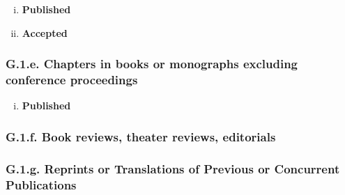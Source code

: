 \documentclass[12pt]{article}
\begin{document}
{{\begin{enumerate}[i)]
\item  {\bf Published} %

\item  {\bf Accepted} %
\end{enumerate}

\subsubsection*{G.1.e. Chapters in books or monographs excluding conference proceedings}

\begin{enumerate}[i)]
\item {\bf Published} %
\end{enumerate}


\subsubsection*{G.1.f. Book reviews, theater reviews, editorials}

\subsubsection*{G.1.g. Reprints or Translations of Previous or Concurrent Publications}

}}
\end{document}

